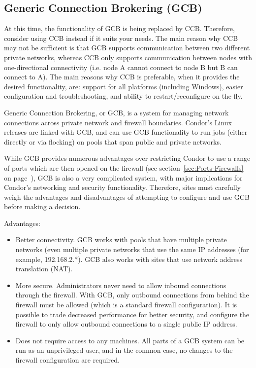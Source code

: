 \subsection{\label{sec:GCB}Generic Connection Brokering (GCB)}

At this time, the functionality of GCB is being replaced by CCB.
Therefore, consider using CCB instead if it suits your needs.  The
main reason why CCB may not be sufficient is that GCB supports
communication between two different private networks, whereas CCB only
supports communication between nodes with one-directional connectivity
(i.e. node A cannot connect to node B but B can connect to A).  The main
reasons why CCB is preferable, when it provides the desired functionality,
are: support for all platforms (including Windows), easier configuration
and troubleshooting, and ability to restart/reconfigure on the fly.

Generic Connection Brokering, or GCB, is a system for managing network
connections across private network and firewall boundaries.
Condor's Linux releases are linked with GCB,
and can use GCB functionality to run jobs
(either directly or via flocking)
on pools that span public and private networks.

While GCB provides numerous advantages over restricting Condor to use
a range of ports which are then opened on the firewall (see
section~\ref{sec:Ports-Firewalls} on
page~\pageref{sec:Ports-Firewalls}),
GCB is also a very complicated system, with major
implications for Condor's networking and security functionality.
Therefore, sites must carefully weigh the 
advantages and disadvantages
of attempting
to configure and use GCB before making a decision.

Advantages:
\begin{itemize}

\item Better connectivity. GCB works with pools that have multiple
  private networks (even multiple private networks that use the same
  IP addresses (for example, 192.168.2.*).
  GCB also works with sites that use network address translation
  (NAT). 

\item More secure. Administrators never need to allow inbound
  connections through the firewall.
  With GCB, only outbound connections from behind the firewall must be
  allowed (which is a standard firewall configuration).
  It is possible to trade decreased performance for better security, and
  configure the firewall to only allow outbound connections to a
  single public IP address.

\item Does not require  access to any machines.
  All parts of a GCB system can be run as an unprivileged user, and in
  the common case, no changes to the firewall configuration are
  required.

\end{itemize}

